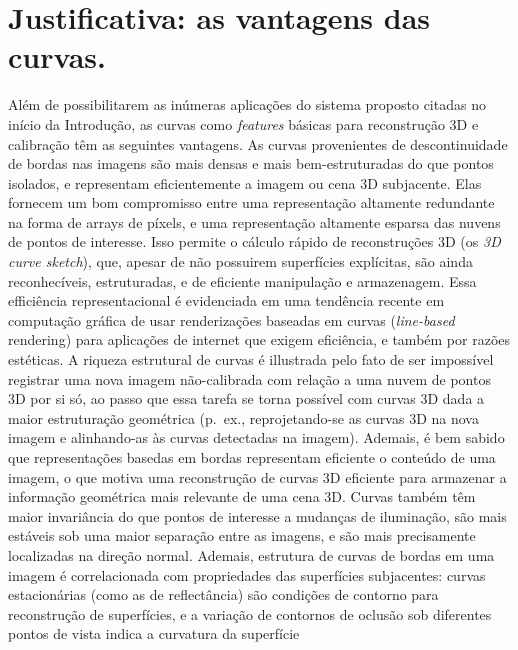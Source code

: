 \documentclass[a4paper,titlepage]{article}
\newcommand{\eg}{{p.\ ex.}}
\begin{document}

\section{Justificativa: as vantagens das curvas.}
Além de possibilitarem as inúmeras aplicações do sistema proposto citadas no início da
Introdução, as curvas como \emph{features} básicas para reconstrução 3D e
calibração têm as seguintes vantagens.  As curvas provenientes de
descontinuidade de bordas nas imagens são mais densas e mais bem-estruturadas do
que pontos isolados, e representam eficientemente a imagem ou cena 3D
subjacente. Elas fornecem um bom compromisso entre uma representação altamente
redundante na forma de arrays de píxels, e uma representação altamente esparsa
das nuvens de pontos de interesse. Isso permite o cálculo rápido de
reconstruções 3D (os \emph{3D curve sketch}), que, apesar de não possuirem
superfícies explícitas, são ainda reconhecíveis, estruturadas, e de eficiente
manipulação e armazenagem. Essa efficiência representacional é evidenciada em
uma tendência recente em computação gráfica de usar renderizações baseadas em
curvas (\emph{line-based} rendering) para aplicações de internet que exigem
eficiência, e também por razões estéticas. A riqueza estrutural de curvas é
illustrada pelo fato de ser impossível registrar uma nova imagem não-calibrada
com relação a uma nuvem de pontos 3D por si só, ao passo que essa tarefa se
torna possível com curvas 3D dada a maior estruturação geométrica (\eg,
reprojetando-se as curvas 3D na nova imagem e alinhando-as às curvas detectadas
na imagem). Ademais, é bem sabido que representações basedas em bordas
representam eficiente o conteúdo de uma imagem, o que motiva uma reconstrução de
curvas 3D eficiente para armazenar a informação geométrica mais relevante de uma
cena 3D. Curvas também têm maior invariância do que pontos de interesse a
mudanças de iluminação, são mais estáveis sob uma maior separação entre as
imagens, e são mais precisamente localizadas na direção normal. Ademais,
estrutura de curvas de bordas em uma imagem é correlacionada com propriedades
das superfícies subjacentes: curvas estacionárias (como as de reflectância) são
condições de contorno para reconstrução de superfícies, e a variação de
contornos de oclusão sob diferentes pontos de vista indica a curvatura da
superfície
\end{document}

